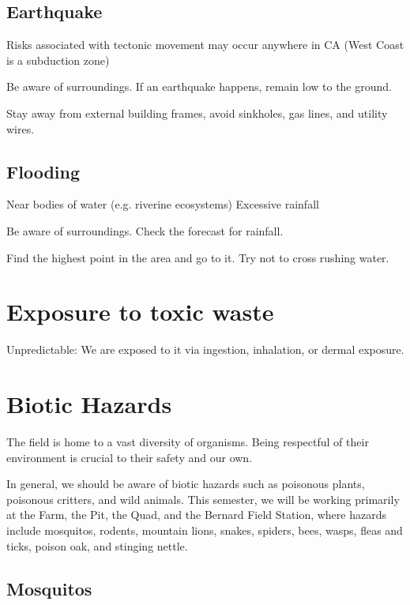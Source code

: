 \documentclass[12pt]{../SOP3_beta}
\begin{document}
\subsection{Earthquake}

\NP Risks associated with tectonic movement may occur anywhere in CA (West Coast is a subduction zone)

\NP Be aware of surroundings. If an earthquake happens, remain low to the ground.

\NP Stay away from external building frames, avoid sinkholes, gas lines, and utility wires.

\subsection{Flooding}

Near bodies of water (e.g. riverine ecosystems)
Excessive rainfall

\NP Be aware of surroundings. Check the forecast for rainfall.

\NP Find the highest point in the area and go to it. Try not to cross rushing water. 



\section{Exposure to toxic waste}


Unpredictable: We are exposed to it via ingestion, inhalation, or dermal exposure.


\section{Biotic Hazards}

\NP The field is home to a vast diversity of organisms. Being respectful of their environment is crucial to their safety and our own.

\NP In general, we should be aware of biotic hazards such as poisonous plants, poisonous critters, and wild animals. This semester, we will be working primarily at the Farm, the Pit, the Quad, and the Bernard Field Station, where hazards include mosquitos, rodents, mountain lions, snakes, spiders, bees, wasps, fleas and ticks, poison oak, and stinging nettle.

\subsection{Mosquitos}
\end{document}
